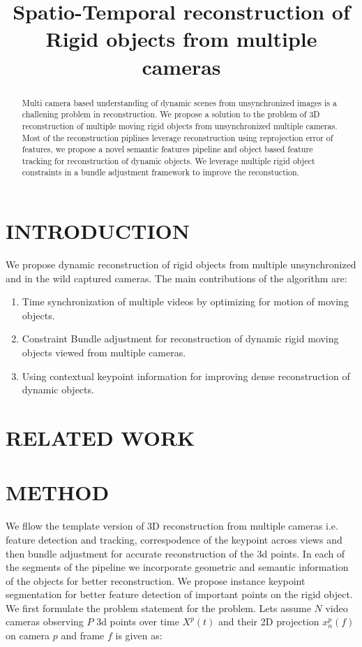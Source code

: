 \documentclass[10pt,twocolumn,letterpaper]{article}
\begin{document}
\title{Spatio-Temporal reconstruction of Rigid objects from multiple cameras}


\maketitle

\begin{abstract}
Multi camera based understanding of dynamic scenes from unsynchronized images is a challening problem in reconstruction. We propose a solution to the problem of 3D reconstruction of multiple moving rigid objects from unsynchronized multiple cameras. Most of the reconstruction piplines leverage reconstruction using reprojection error of features, we propose a novel semantic features pipeline and object based feature tracking for reconstruction of dynamic objects. We leverage multiple rigid object constraints in a bundle adjustment framework to improve the reconstuction. \end{abstract}

\section{INTRODUCTION}
We propose dynamic reconstruction of rigid objects from multiple unsynchronized and in the wild captured cameras. The main contributions of the algorithm are:
\begin{enumerate}
\item  Time synchronization of multiple videos by optimizing for motion of moving objects. 
\item Constraint Bundle adjustment for reconstruction of dynamic rigid moving objects viewed from multiple cameras. 
\item Using contextual keypoint information for improving dense reconstruction of dynamic objects.
\end{enumerate}

\section{RELATED WORK}

\section{METHOD}
We fllow the template version of 3D reconstruction from multiple cameras i.e. feature detection and tracking, correspodence of the keypoint across views and then bundle adjustment for accurate reconstruction of the 3d points. In each of the segments of the pipeline we incorporate geometric and semantic information of the objects for better reconstruction. We propose instance keypoint segmentation for better feature detection of important points on the rigid object. 
We first formulate the problem statement for the problem. Lets assume $N$ video cameras observing $P$ 3d points over time $X^p(t)$ and their 2D projection $x^p_n(f)$ on camera $p$ and frame $f$ is given as:
\end{document}
